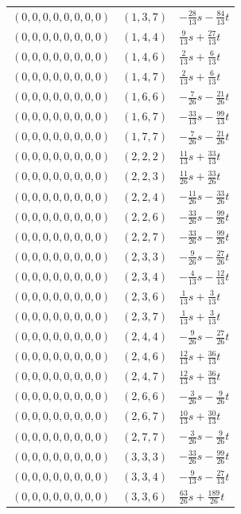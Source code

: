 \begin{longtable}{@{}lll@{}}
$(0,0,0,0,0,0,0,0)$ & $(1,3,7)$ & $-\frac{28}{13}s-\frac{84}{13}t$\\
$(0,0,0,0,0,0,0,0)$ & $(1,4,4)$ & $\frac{9}{13}s+\frac{27}{13}t$\\
$(0,0,0,0,0,0,0,0)$ & $(1,4,6)$ & $\frac{2}{13}s+\frac{6}{13}t$\\
$(0,0,0,0,0,0,0,0)$ & $(1,4,7)$ & $\frac{2}{13}s+\frac{6}{13}t$\\
$(0,0,0,0,0,0,0,0)$ & $(1,6,6)$ & $-\frac{7}{26}s-\frac{21}{26}t$\\
$(0,0,0,0,0,0,0,0)$ & $(1,6,7)$ & $-\frac{33}{13}s-\frac{99}{13}t$\\
$(0,0,0,0,0,0,0,0)$ & $(1,7,7)$ & $-\frac{7}{26}s-\frac{21}{26}t$\\
$(0,0,0,0,0,0,0,0)$ & $(2,2,2)$ & $\frac{11}{13}s+\frac{33}{13}t$\\
$(0,0,0,0,0,0,0,0)$ & $(2,2,3)$ & $\frac{11}{26}s+\frac{33}{26}t$\\
$(0,0,0,0,0,0,0,0)$ & $(2,2,4)$ & $-\frac{11}{26}s-\frac{33}{26}t$\\
$(0,0,0,0,0,0,0,0)$ & $(2,2,6)$ & $-\frac{33}{26}s-\frac{99}{26}t$\\
$(0,0,0,0,0,0,0,0)$ & $(2,2,7)$ & $-\frac{33}{26}s-\frac{99}{26}t$\\
$(0,0,0,0,0,0,0,0)$ & $(2,3,3)$ & $-\frac{9}{26}s-\frac{27}{26}t$\\
$(0,0,0,0,0,0,0,0)$ & $(2,3,4)$ & $-\frac{4}{13}s-\frac{12}{13}t$\\
$(0,0,0,0,0,0,0,0)$ & $(2,3,6)$ & $\frac{1}{13}s+\frac{3}{13}t$\\
$(0,0,0,0,0,0,0,0)$ & $(2,3,7)$ & $\frac{1}{13}s+\frac{3}{13}t$\\
$(0,0,0,0,0,0,0,0)$ & $(2,4,4)$ & $-\frac{9}{26}s-\frac{27}{26}t$\\
$(0,0,0,0,0,0,0,0)$ & $(2,4,6)$ & $\frac{12}{13}s+\frac{36}{13}t$\\
$(0,0,0,0,0,0,0,0)$ & $(2,4,7)$ & $\frac{12}{13}s+\frac{36}{13}t$\\
$(0,0,0,0,0,0,0,0)$ & $(2,6,6)$ & $-\frac{3}{26}s-\frac{9}{26}t$\\
$(0,0,0,0,0,0,0,0)$ & $(2,6,7)$ & $\frac{10}{13}s+\frac{30}{13}t$\\
$(0,0,0,0,0,0,0,0)$ & $(2,7,7)$ & $-\frac{3}{26}s-\frac{9}{26}t$\\
$(0,0,0,0,0,0,0,0)$ & $(3,3,3)$ & $-\frac{33}{26}s-\frac{99}{26}t$\\
$(0,0,0,0,0,0,0,0)$ & $(3,3,4)$ & $-\frac{9}{13}s-\frac{27}{13}t$\\
$(0,0,0,0,0,0,0,0)$ & $(3,3,6)$ & $\frac{63}{26}s+\frac{189}{26}t$\\

\end{longtable}
